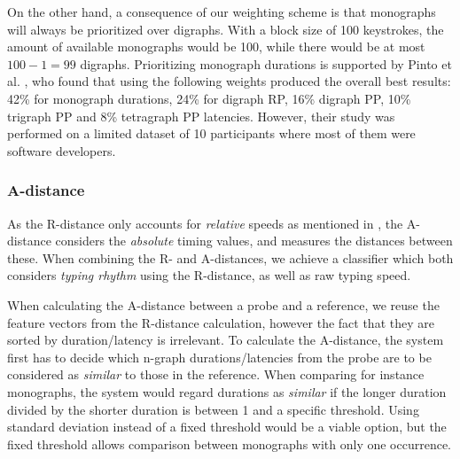On the other hand, a consequence of our weighting scheme is that monographs will always be prioritized over digraphs.
With a block size of 100 keystrokes, the amount of available monographs would be 100, while there would be at most $100 - 1 = 99$ digraphs.
Prioritizing monograph durations is supported by Pinto et al. \cite{Pinto2014}, who found that using the following weights produced the overall best results: 42\% for monograph durations, 24\% for digraph RP, 16\% digraph PP, 10\% trigraph PP and 8\% tetragraph PP latencies.
However, their study was performed on a limited dataset of 10 participants where most of them were software developers.

\subsubsection{A-distance}
As the R-distance only accounts for \textit{relative} speeds as mentioned in , the A-distance considers the \textit{absolute} timing values, and measures the distances between these.
When combining the R- and A-distances, we achieve a classifier which both considers \textit{typing rhythm} using the R-distance, as well as raw typing speed.

When calculating the A-distance between a probe and a reference, we reuse the feature vectors from the R-distance calculation, however the fact that they are sorted by duration/latency is irrelevant.
To calculate the A-distance, the system first has to decide which n-graph durations/latencies from the probe are to be considered as \textit{similar} to those in the reference.
When comparing for instance monographs, the system would regard durations as \textit{similar} if the longer duration divided by the shorter duration is between 1 and a specific threshold.
Using standard deviation instead of a fixed threshold would be a viable option, but the fixed threshold allows comparison between monographs with only one occurrence.


